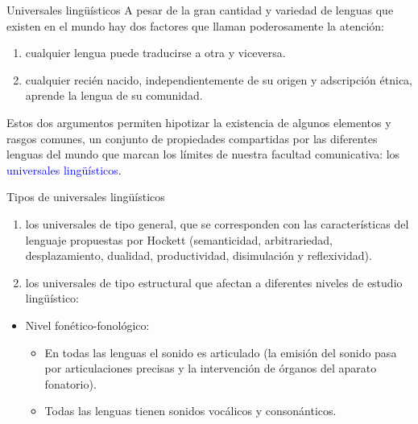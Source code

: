 \documentclass[handout]{beamer}
\begin{document}
\begin{frame}{Universales lingüísticos}
A pesar de la gran cantidad y variedad de lenguas que existen en el mundo hay dos factores que
llaman poderosamente la atención:

\begin{enumerate}
	\item cualquier lengua puede traducirse a otra y viceversa.
	\item cualquier recién nacido, independientemente de su origen y adscripción étnica, aprende la lengua de su comunidad.
\end{enumerate}

Estos dos argumentos permiten hipotizar la existencia de algunos elementos y rasgos comunes, un conjunto de propiedades compartidas por las diferentes lenguas del mundo que marcan los límites de nuestra facultad comunicativa: los \textcolor{blue}{universales lingüísticos}.

\end{frame}

\begin{frame}{Tipos de universales lingüísticos}

\begin{enumerate}
	\item los universales de tipo general, que se corresponden con las características del lenguaje propuestas por Hockett (semanticidad, arbitrariedad, desplazamiento, dualidad, productividad, disimulación y reflexividad).
	\item los universales de tipo estructural que afectan a diferentes niveles de estudio lingüístico:
\end{enumerate}

\begin{itemize}
	\item Nivel fonético-fonológico: 
	\begin{itemize}
		\item En todas las lenguas el sonido es articulado (la emisión del sonido pasa por articulaciones precisas y la intervención de órganos del aparato fonatorio). 
		\item Todas las lenguas tienen sonidos vocálicos y consonánticos.
	\end{itemize}
\end{itemize}

\end{frame}
\end{document}
